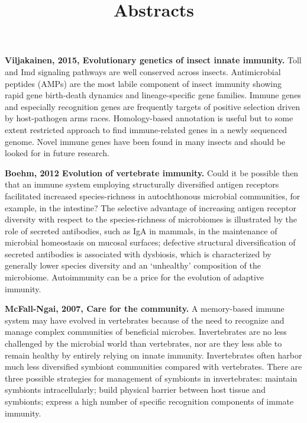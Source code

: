 \documentclass[11pt]{article}
\title{Abstracts}
\author{}
\date{}
\begin{document}
\begin{sloppypar}
  \maketitle

  \linenumbers

\textbf{Viljakainen, 2015, Evolutionary genetics of insect innate immunity.} \newline
Toll and Imd signaling pathways are well conserved across insects. 
Antimicrobial peptides (AMPs) are the most labile component of insect immunity showing rapid gene birth-death dynamics and lineage-specific gene families. 
Immune genes and especially recognition genes are frequently targets of positive selection driven by host-pathogen arms races. 
Homology-based annotation is useful but to some extent restricted approach to find immune-related genes in a newly sequenced genome. 
Novel immune genes have been found in many insects and should be looked for in future research.

\par

\textbf{Boehm, 2012 Evolution of vertebrate immunity.} \newline
Could it be possible then that an immune system employing structurally diversified antigen receptors facilitated increased species-richness in autochthonous microbial communities, for example, in the intestine? 
The selective advantage of increasing antigen receptor diversity with respect to the species-richness of microbiomes is illustrated by the role of secreted antibodies, such as IgA in mammals, in the maintenance of microbial homeostasis on mucosal surfaces; defective structural diversification of secreted antibodies is associated with dysbiosis, which is characterized by generally lower species diversity and an ‘unhealthy’ composition of the microbiome. 
Autoimmunity can be a price for the evolution of adaptive immunity. 

\textbf{McFall-Ngai, 2007, Care for the community.} \newline
A memory-based immune system may have evolved in vertebrates because of the need to recognize and manage complex communities of beneficial microbes. 
Invertebrates are no less challenged by the microbial world than vertebrates, nor are they less able to remain healthy by entirely relying on innate immunity. 
Invertebrates often harbor much less diversified symbiont communities compared with vertebrates. 
There are three possible strategies for management of symbionts in invertebrates: 
maintain symbionts intracellularly; 
build physical barrier between host tissue and symbionts; 
express a high number of specific recognition components of immate immunity. 

\end{sloppypar}
\end{document}
